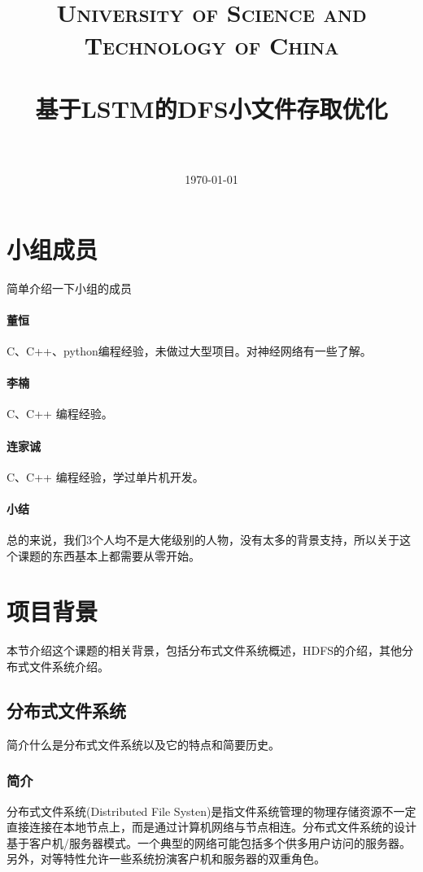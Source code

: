 \documentclass[UTF8]{ctexart}
\title{
  \normalfont \normalsize 
  \textsc{\\~\\~\\~\\~\\~\\University of Science and Technology of China} \\ [25pt] %
  \horrule{0.5pt} \\[0.4cm] %
  \huge 基于LSTM的DFS小文件存取优化 \\ %
  \horrule{2pt} \\[0.5cm] %
}
\date{\today}
\begin{document}
\maketitle
\clearpage
\tableofcontents
\clearpage
\section{小组成员}
简单介绍一下小组的成员

\paragraph{董恒}
C、C++、python编程经验，未做过大型项目。对神经网络有一些了解。

\paragraph{李楠}
C、C++ 编程经验。

\paragraph{连家诚}
C、C++ 编程经验，学过单片机开发。

\paragraph{小结}
总的来说，我们3个人均不是大佬级别的人物，没有太多的背景支持，所以关于这个课题的东西基本上都需要从零开始。






\section{项目背景}
本节介绍这个课题的相关背景，包括分布式文件系统概述，HDFS的介绍，其他分布式文件系统介绍。

\subsection{分布式文件系统}
简介什么是分布式文件系统以及它的特点和简要历史。

\subsubsection{简介}
分布式文件系统(Distributed File Systen)是指文件系统管理的物理存储资源不一定直接连接在本地节点上，而是通过计算机网络与节点相连。分布式文件系统的设计基于客户机/服务器模式。一个典型的网络可能包括多个供多用户访问的服务器。另外，对等特性允许一些系统扮演客户机和服务器的双重角色。
\end{document}
